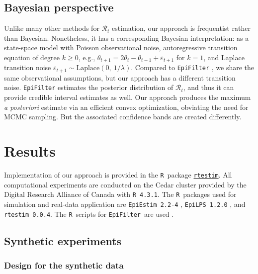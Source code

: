 \documentclass[10pt,letterpaper]{article}
\newcommand{\R}{\texttt{R}}
\def\EpiFilter{\texttt{EpiFilter}}
\def\calR{\mathcal{R}}
\begin{document}
\subsection{Bayesian perspective}

Unlike many other methods for $\calR_t$ estimation, our approach is frequentist
rather than Bayesian. Nonetheless, it has a corresponding Bayesian
interpretation: as a state-space model with Poisson observational noise,
autoregressive transition equation of degree $k\geq 0$, e.g., $\theta_{t+1} =
2\theta_t - \theta_{t-1} + \varepsilon_{t+1}$ for $k=1$, and Laplace transition
noise $\varepsilon_{t+1}\sim \mathrm{Laplace}(0,\ 1/\lambda)$. Compared to
\texttt{EpiFilter} \cite{parag2021improved},
 we share the same observational assumptions, but our approach has a
different transition noise. \texttt{EpiFilter} estimates the posterior
distribution of
$\calR_t$, and thus it can provide credible interval estimates as well. Our
approach produces the maximum \emph{a posteriori} estimate via an efficient
convex optimization, obviating the need for MCMC sampling. But the associated
confidence bands are created differently.


\section{Results}

Implementation of our approach is provided in the \R\ package
\href{https://dajmcdon.github.io/rtestim/}{\texttt{rtestim}}. All computational
experiments are conducted on the Cedar cluster provided by the Digital Research
Alliance of Canada with \texttt{R 4.3.1}. The \R\ packages used for simulation
and real-data application are \texttt{EpiEstim 2.2-4} \cite{Cori2022},
\texttt{EpiLPS 1.2.0} \cite{Gressani2021}, and \texttt{rtestim 0.0.4}. The \R\
scripts for \EpiFilter\ are used \cite{kpzoo2020}.

\subsection{Synthetic experiments}

\subsubsection{Design for the synthetic data}
\end{document}
